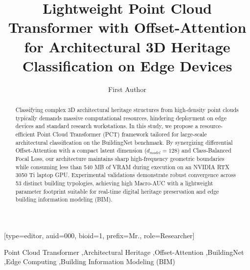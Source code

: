 \documentclass[a4paper,fleqn]{cas-dc}
\begin{document}
\let\WriteBookmarks\relax
\def\floatpagepagefraction{1}
\def\textpagefraction{.001}

\title [mode = title]{Lightweight Point Cloud Transformer with Offset-Attention for Architectural 3D Heritage Classification on Edge Devices}

\author[1]{First Author}[type=editor, auid=000, bioid=1, prefix=Mr., role=Researcher]
\cormark[1]

\address[1]{University of Economics Ho Chi Minh City (UEH), 59C Nguyen Dinh Chieu, Vo Thi Sau Ward, District 3, Ho Chi Minh City, Vietnam}


\begin{abstract}
Classifying complex 3D architectural heritage structures from high-density point clouds typically demands massive computational resources, hindering deployment on edge devices and standard research workstations. In this study, we propose a resource-efficient Point Cloud Transformer (PCT) framework tailored for large-scale architectural classification on the BuildingNet benchmark. By synergizing differential Offset-Attention with a compact latent dimension ($d_{model} = 128$) and Class-Balanced Focal Loss, our architecture maintains sharp high-frequency geometric boundaries while consuming less than 540 MB of VRAM during execution on an NVIDIA RTX 3050 Ti laptop GPU. Experimental validations demonstrate robust convergence across 53 distinct building typologies, achieving high Macro-AUC with a lightweight parameter footprint suitable for real-time digital heritage preservation and edge building information modeling (BIM).
\end{abstract}

\begin{keywords}
Point Cloud Transformer \sep Architectural Heritage \sep Offset-Attention \sep BuildingNet \sep Edge Computing \sep Building Information Modeling (BIM)
\end{keywords}

\maketitle









\end{document}
